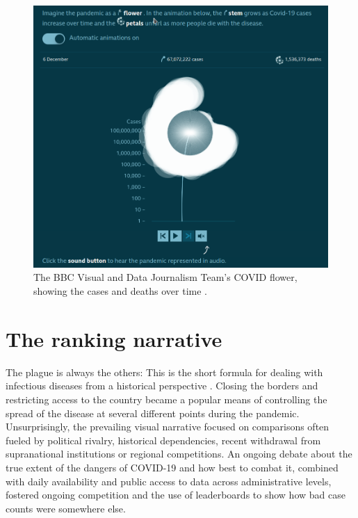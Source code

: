 \documentclass[article]{jdssv}\usepackage[]{graphicx}\usepackage[]{xcolor}
\begin{document}
\begin{figure}
\centering
\includegraphics[width=.8\linewidth]{Figures_Web/BBC_flower_time_series}
\caption{The BBC Visual and Data Journalism Team's COVID flower, showing the cases and deaths over time \citep{thebbcvisualanddatajournalismteamCoronavirusHowCan2020}.}\label{fig:bbc-flower}
\end{figure}


\section{The ranking narrative}
\label{sec:rankings}

The plague is always the others: This is the short formula for dealing with infectious diseases from a historical perspective \citep{thiessen2021}. Closing the borders and restricting access to the country became a popular means of controlling the spread of the disease at several different points during the pandemic. Unsurprisingly, the prevailing visual narrative focused on comparisons often fueled by political rivalry, historical dependencies, recent withdrawal from supranational institutions or regional competitions. An ongoing debate about the true extent of the dangers of COVID-19 and how best to combat it, combined with daily availability and public access to data across administrative levels, fostered ongoing competition and the use of leaderboards to show how bad case counts were somewhere else. 
\end{document}
